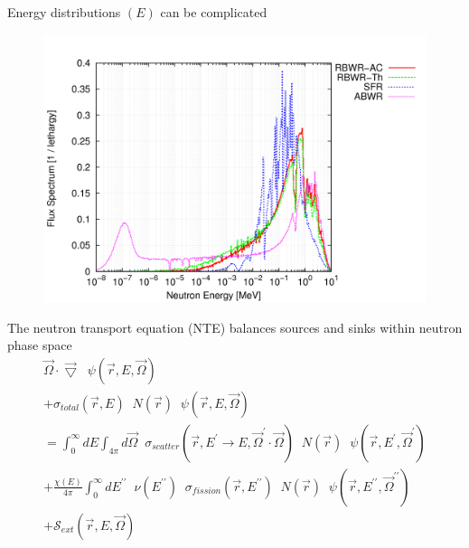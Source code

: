 \documentclass{beamer}
\begin{document}
        \begin{frame}{Energy distributions $(E)$ can be complicated}
            \begin{figure}
                \centering
                \includegraphics[width=1.0\textwidth]{./img/energyFlux.png}
                \caption*{}
            \end{figure}
        \end{frame}

        \begin{frame}{The neutron transport equation (NTE) balances sources and sinks within neutron phase space}
            \begin{equation*}
                \begin{split}
                    \vec \Omega \cdot \vec \bigtriangledown \; \; \psi(\vec r, E, \vec \Omega) \\
                    + \sigma_{total}(\vec r, E) \; \; N(\vec r) \; \; \psi(\vec r, E, \vec\Omega) \\
                    = \int_0^\infty \! \! \! \! dE \int_{4\pi} \! \! \! \! d\vec\Omega \; \; \sigma_{scatter}(\vec r, E^\prime \rightarrow E, \vec \Omega^\prime \cdot \vec \Omega) \; \; N(\vec r) \; \; \psi(\vec r, E^\prime, \vec\Omega^\prime) \\
                    + \frac{\chi(E)}{4\pi} \int_0^\infty \! \! \! \! dE^{\prime\prime} \; \; \nu (E^{\prime\prime}) \; \; \sigma_{fission}(\vec r, E^{\prime\prime}) \; \; N(\vec r) \; \; \psi(\vec r, E^{\prime\prime}, \vec\Omega^{\prime\prime}) \\
                    + \mathcal{S}_{ext}(\vec r, E, \vec\Omega)
                \end{split}
            \end{equation*}
        \end{frame}
\end{document}
